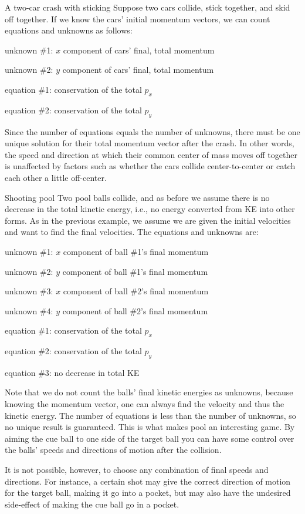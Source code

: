 \begin{eg}{A two-car crash with sticking}
Suppose two cars collide, stick together, and skid off
together. If we know the cars' initial momentum vectors, we
can count equations and unknowns as follows:

unknown \#1: $x$ component of cars' final, total momentum

unknown \#2: $y$ component of cars' final, total momentum

equation \#1: conservation of the total $p_x$

equation \#2: conservation of the total $p_y$

\noindent Since the number of equations equals the number of unknowns,
there must be one unique solution for their total momentum
vector after the crash. In other words, the speed and
direction at which their common center of mass moves off
together is unaffected by factors such as whether the cars
collide center-to-center or catch each other a little off-center.
\end{eg}

\begin{eg}{Shooting pool}
Two pool balls collide, and as before we assume there is no
decrease in the total kinetic energy, i.e., no energy
converted from KE into other forms. As in the previous
example, we assume we are given the initial velocities and
want to find the final velocities. The equations and unknowns are:

unknown \#1: $x$ component of ball \#1's final momentum

unknown \#2: $y$ component of ball \#1's final momentum

unknown \#3: $x$ component of ball \#2's final momentum

unknown \#4: $y$ component of ball \#2's final momentum

equation \#1: conservation of the total $p_x$

equation \#2: conservation of the total $p_y$

equation \#3: no decrease in total KE

Note that we do not count the balls' final kinetic energies
as unknowns, because knowing the momentum vector, one can
always find the velocity and thus the kinetic energy. The
number of equations is less than the number of unknowns, so
no unique result is guaranteed. This is what makes pool an
interesting game. By aiming the cue ball to one side of the
target ball you can have some control over the balls' speeds
and directions of motion after the collision.

It is not possible, however, to choose any combination of
final speeds and directions. For instance, a certain shot
may give the correct direction of motion for the target
ball, making it go into a pocket, but may also have the
undesired side-effect of making the cue ball go in a pocket.
\end{eg}

